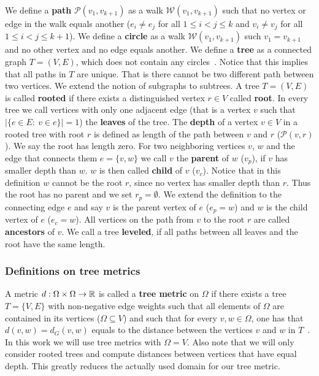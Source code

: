 \begin{frame}[allowframebreaks=0.9]
	We define a \textbf{path} $\mathcal{P}(v_1, v_{k+1})$ as a walk $\mathcal{W}(v_1, v_{k+1})$ such that no vertex or edge in the walk equals another ($e_i\neq e_j$ for all $1\le i<j\le k$ and $v_i\neq v_j$ for all $1\le i<j\le k+1$).
	We define a \textbf{circle} as a walk $\mathcal{W}(v_1, v_{k+1})$ such $v_1 = v_{k+1}$ and no other vertex and no edge equals another.
	We define a \textbf{tree}\label{def:Tree} as a connected graph $T=(V, E)$, which does not contain any circles~\cite{2018_Korte_BOOK}. 
	Notice that this implies that all paths in $T$ are unique. 
	That is there cannot be two different path between two vertices.
	We extend the notion of subgraphs to subtrees.
	A tree $T=(V, E)$ is called \textbf{rooted} if there exists a distinguished vertex $r\in V$ called \textbf{root}.
	In every tree we call vertices with only one adjacent edge (that is a vertex $v$ such that $|\{e\in E:\ v\in e\}|=1$) the \textbf{leaves} of the tree.
	The \textbf{depth} of a vertex $v\in V$ in a rooted tree with root $r$ is defined as length of the path between $v$ and $r$ ($\mathcal{P}(v,r)$).
	We say the root has length zero.
	For two neighboring vertices $v$, $w$ and the edge that connects them $e=\{v, w\}$ we call $v$ the \textbf{parent} of $w$ ($v_p$), if $v$ has smaller depth than $w$.
	$w$ is then called \textbf{child} of $v$ ($v_c$).
	Notice that in this definition $w$ cannot be the root $r$, since no vertex has smaller depth than $r$. 
	Thus the root has no parent and we set $r_p=\emptyset$.
	We extend the definition to the connecting edge $e$ and say $v$ is the parent vertex of $e$ ($e_p=w$) and $w$ is the child vertex of $e$ ($e_c=w$).
	All vertices on the path from $v$ to the root $r$ are called \textbf{ancestors} of $v$.
	We call a tree \textbf{leveled}, if all paths between all leaves and the root have the same length.
\end{frame}

\begin{frame}[allowframebreaks=0.9] \frametitle{Definitions on tree metrics}
	A metric $d:\Omega\times\Omega\to\mathbb{R}$ is called a \textbf{tree metric} on $\Omega$ if there exists a tree $T=\{V, E\}$ with non-negative edge weights such that all elements of $\Omega$ are contained in its vertices ($\Omega\subseteq V$) and such that for every $v, w\in\Omega$, one has that $d(v,w) = d_G(v,w)$ equals to the distance between the vertices $v$ and $w$ in $T$~\cite{2019_Le_NIPS}.%
	In this work we will use tree metrics with $\Omega=V$.
	Also note that we will only consider rooted trees and compute distances between vertices that have equal depth.
	This greatly reduces the actually used domain for our tree metric.
\end{frame}

